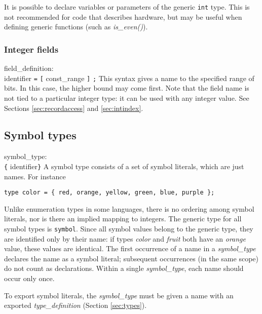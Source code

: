 It is possible to declare variables or parameters of the generic {\tt{}int}
type. This is not recommended for code that describes hardware, but may be
useful when defining generic functions (such as {\it{}is\_even()}).



\subsubsection{Integer fields}\label{sec:fielddef}

\grammarstart
field\_definition: \\
       identifier {\tt{}=} {\tt{}[} const\_range {\tt{}]} {\tt{};}
\grammarend
This syntax gives a name to the specified range of bits. In this case,
the higher bound may come first. Note that the field name is not tied
to a particular integer type: it can be used with any integer value.
See Sections \ref{sec:recordaccess} and \ref{sec:intindex}.


\subsection{Symbol types}\label{sec:symbol}

\grammarstart
symbol\_type: \\
      \>\verb|{| identifier\LIST \verb|}|
\grammarend
A symbol type consists of a set of symbol literals, which are just names.
For instance
\begin{verbatim}
type color = { red, orange, yellow, green, blue, purple };
\end{verbatim}
Unlike enumeration types in some languages, there is no ordering among
symbol literals, nor is there an implied mapping to integers. The
generic type for all symbol types is {\tt{}symbol}. Since all symbol values
belong to the generic type, they are identified only by their name:
if types {\it{}color} and {\it{}fruit} both have an {\it{}orange} value, these
values are identical. The first occurrence of a name in a {\it{}symbol\_type}
declares the name as a symbol literal; subsequent occurrences (in the same
scope) do not count as declarations. Within a single {\it{}symbol\_type},
each name should occur only once.

To export symbol literals, the {\it{}symbol\_type} must be given a name
with an exported {\it{}type\_definition} (Section \ref{sec:types}).


